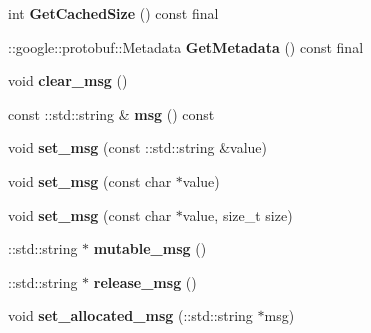 \begin{DoxyCompactItemize}
int {\bfseries Get\+Cached\+Size} () const final
\item 
\mbox{\label{classcoappbrpc_1_1api_1_1PingRequest_a062f1b78184efeb1c5bcb746b5cae04f}} 
\+::google\+::protobuf\+::\+Metadata {\bfseries Get\+Metadata} () const final
\item 
\mbox{\label{classcoappbrpc_1_1api_1_1PingRequest_ada50692b86727e3a3398ffbba1f83b58}} 
void {\bfseries clear\+\_\+msg} ()
\item 
\mbox{\label{classcoappbrpc_1_1api_1_1PingRequest_a38424a4a7b93fb521cb4d47f2bdd48e8}} 
const \+::std\+::string \& {\bfseries msg} () const
\item 
\mbox{\label{classcoappbrpc_1_1api_1_1PingRequest_a86bd93f47602e5511cf764673b09fa1a}} 
void {\bfseries set\+\_\+msg} (const \+::std\+::string \&value)
\item 
\mbox{\label{classcoappbrpc_1_1api_1_1PingRequest_aed4cfab2c4d342b68c9ebc04b1c501d7}} 
void {\bfseries set\+\_\+msg} (const char $\ast$value)
\item 
\mbox{\label{classcoappbrpc_1_1api_1_1PingRequest_aa4dc34e2698d560ca5ba5f9787c78367}} 
void {\bfseries set\+\_\+msg} (const char $\ast$value, size\+\_\+t size)
\item 
\mbox{\label{classcoappbrpc_1_1api_1_1PingRequest_a2f456870de3a0beff915d77edff12539}} 
\+::std\+::string $\ast$ {\bfseries mutable\+\_\+msg} ()
\item 
\mbox{\label{classcoappbrpc_1_1api_1_1PingRequest_ac2e4f136dc2b3fbb9f68abe797ba11b2}} 
\+::std\+::string $\ast$ {\bfseries release\+\_\+msg} ()
\item 
\mbox{\label{classcoappbrpc_1_1api_1_1PingRequest_a2d6cc178569448cc55be9d69531c8a3c}} 
void {\bfseries set\+\_\+allocated\+\_\+msg} (\+::std\+::string $\ast$msg)
\end{DoxyCompactItemize}
